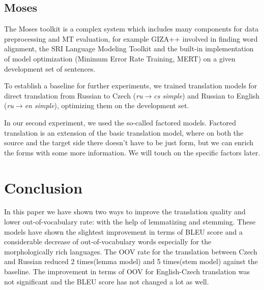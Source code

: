 \documentclass[11pt,letterpaper]{article}
\begin{document}
\subsection{Moses}
The Moses toolkit \cite{moses} is a complex system which includes many components
for data preprocessing and MT evaluation, for example
GIZA++ %
involved in finding word alignment, the SRI Language Modeling
Toolkit %
and the built-in implementation of model optimization (Minimum Error Rate Training, MERT) on a
given development set of sentences.

To establish a baseline for further experiments, we trained translation models for direct translation
from Russian to Czech
(\emph{ru$\rightarrow$cs simple}) and Russian to English (\emph{ru$\rightarrow$en simple}), %
optimizing them on the development set.

In our second experiment, we used the so-called factored models. Factored translation is an extension of the basic translation model, where on both the source and the target side there doesn't have to be just form, but we can enrich the forms with some more information. We will touch on the specific factors later.




\section{Conclusion}
In this paper we have shown two ways to improve the translation quality and lower out-of-vocabulary rate:
with the help of lemmatizing and stemming. These models have shown the slightest improvement in terms of BLEU
score and a considerable decrease of out-of-vocabulary words especially for the morphologically rich languages. 
The OOV rate for the translation between Czech and Russian reduced 2 times(lemma model) and 5 times(stem model) 
against the baseline. The improvement in terms of OOV for English-Czech translation was not
significant and the BLEU score has not changed a lot as well.
\end{document}
